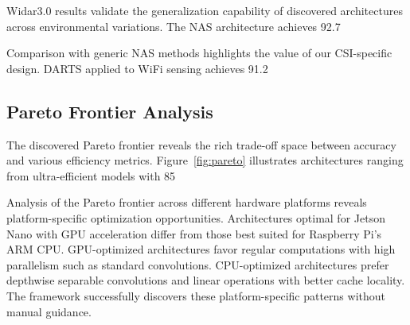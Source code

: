 \documentclass[journal]{IEEEtran}
\begin{document}
Widar3.0 results validate the generalization capability of discovered architectures across environmental variations. The NAS architecture achieves 92.7%

Comparison with generic NAS methods highlights the value of our CSI-specific design. DARTS applied to WiFi sensing achieves 91.2%

\subsection{Pareto Frontier Analysis}

The discovered Pareto frontier reveals the rich trade-off space between accuracy and various efficiency metrics. Figure~\ref{fig:pareto} illustrates architectures ranging from ultra-efficient models with 85%

Analysis of the Pareto frontier across different hardware platforms reveals platform-specific optimization opportunities. Architectures optimal for Jetson Nano with GPU acceleration differ from those best suited for Raspberry Pi's ARM CPU. GPU-optimized architectures favor regular computations with high parallelism such as standard convolutions. CPU-optimized architectures prefer depthwise separable convolutions and linear operations with better cache locality. The framework successfully discovers these platform-specific patterns without manual guidance.
\end{document}
